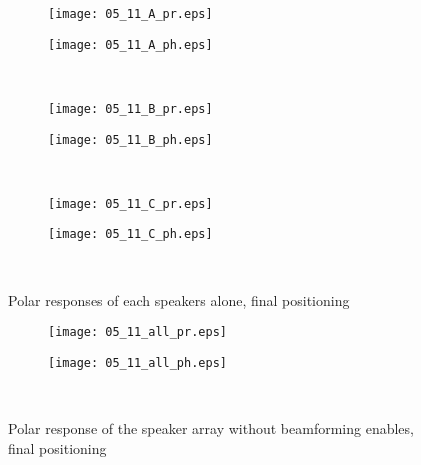 \begin{figure}[h]
\begin{subfigure}[c]{0.5\textwidth}
\texttt{[image: 05\_11\_A\_pr.eps]}
\label{fig:05_11_A_pr}
\end{subfigure}
\begin{subfigure}[c]{0.5\textwidth}
\texttt{[image: 05\_11\_A\_ph.eps]}
\label{fig:05_11_A_ph}
\end{subfigure}\\
\hspace{0.1\textheight}
\begin{subfigure}[c]{0.5\textwidth}
\texttt{[image: 05\_11\_B\_pr.eps]}
\label{fig:05_11_A_pr}
\end{subfigure}
\begin{subfigure}[c]{0.5\textwidth}
\texttt{[image: 05\_11\_B\_ph.eps]}
\label{fig:05_11_A_ph}
\end{subfigure}\\
\hspace{0.1\textheight}
\begin{subfigure}[c]{0.5\textwidth}
\texttt{[image: 05\_11\_C\_pr.eps]}
\label{fig:05_11_A_pr}
\end{subfigure}
\begin{subfigure}[c]{0.5\textwidth}
\texttt{[image: 05\_11\_C\_ph.eps]}
\label{fig:05_11_A_ph}
\end{subfigure}\\
\caption{Polar responses of each speakers alone, final positioning}  
\label{fig:05_11_single}
\end{figure}

\begin{figure}[h]
\begin{subfigure}[c]{0.5\textwidth}
\texttt{[image: 05\_11\_all\_pr.eps]}
\label{fig:05_11_all_pr}
\end{subfigure}
\begin{subfigure}[c]{0.5\textwidth}
\texttt{[image: 05\_11\_all\_ph.eps]}
\label{fig:05_11_all_ph}
\end{subfigure}\\
\caption{Polar response of the speaker array without beamforming enables, final positioning}  
\label{fig:05_11_all}
\end{figure}